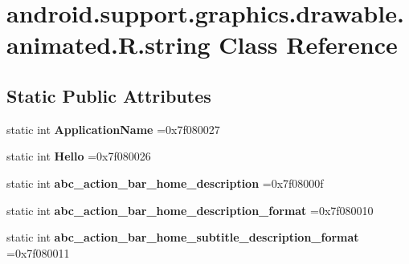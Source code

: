 \hypertarget{classandroid_1_1support_1_1graphics_1_1drawable_1_1animated_1_1R_1_1string}{}\section{android.\+support.\+graphics.\+drawable.\+animated.\+R.\+string Class Reference}
\label{classandroid_1_1support_1_1graphics_1_1drawable_1_1animated_1_1R_1_1string}
\subsection*{Static Public Attributes}
\begin{DoxyCompactItemize}
\item 
\mbox{\label{classandroid_1_1support_1_1graphics_1_1drawable_1_1animated_1_1R_1_1string_a08539e58530497524dc83d117ac3bcd7}} 
static int {\bfseries Application\+Name} =0x7f080027
\item 
\mbox{\label{classandroid_1_1support_1_1graphics_1_1drawable_1_1animated_1_1R_1_1string_a1222833a060c25a7fa4bdd64a8bee743}} 
static int {\bfseries Hello} =0x7f080026
\item 
\mbox{\label{classandroid_1_1support_1_1graphics_1_1drawable_1_1animated_1_1R_1_1string_a7a743aa019f7c2177479f63061417cca}} 
static int {\bfseries abc\+\_\+action\+\_\+bar\+\_\+home\+\_\+description} =0x7f08000f
\item 
\mbox{\label{classandroid_1_1support_1_1graphics_1_1drawable_1_1animated_1_1R_1_1string_aeda1a826566e8cf4f9f0280a00f1f35d}} 
static int {\bfseries abc\+\_\+action\+\_\+bar\+\_\+home\+\_\+description\+\_\+format} =0x7f080010
\item 
\mbox{\label{classandroid_1_1support_1_1graphics_1_1drawable_1_1animated_1_1R_1_1string_a740aa74daec4ea72d93be5c891f4f96c}} 
static int {\bfseries abc\+\_\+action\+\_\+bar\+\_\+home\+\_\+subtitle\+\_\+description\+\_\+format} =0x7f080011

\end{DoxyCompactItemize}

